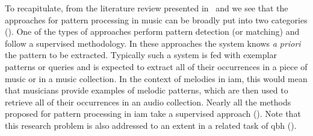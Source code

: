 
To recapitulate, from the literature review presented in~ and  we see that the approaches for pattern processing in music can be broadly put into two categories (). One of the types of approaches perform pattern detection (or matching) and follow a supervised methodology. In these approaches the system knows \textit{a priori} the pattern to be extracted. Typically such a system is fed with exemplar patterns or queries and is expected to extract all of their occurrences in a piece of music or in a music collection. In the context of melodies in \gls{iam}, this would mean that musicians provide examples of melodic patterns, which are then used to retrieve all of their occurrences in an audio collection. Nearly all the methods proposed for pattern processing in \gls{iam} take a supervised approach (). Note that this research problem is also addressed to an extent in a related task of \acrfull{qbh} ().


